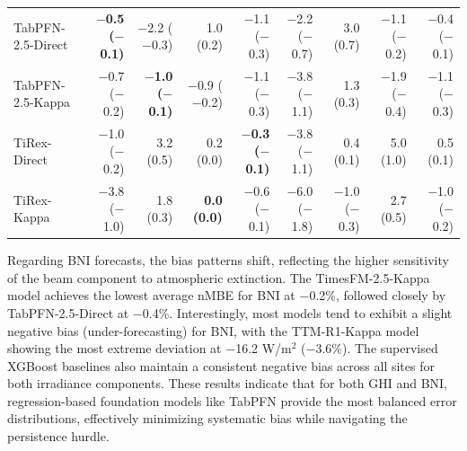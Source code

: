 \documentclass[number, 3p, 10pt, times]{elsarticle}
\begin{document}
\begin{table}[!ht]
\begin{tabular}{lrrrrrrrr}
TabPFN-2.5-Direct & \textbf{$-$0.5 ($-$0.1)} & $-$2.2 ($-$0.3) & 1.0 (0.2) & $-$1.1 ($-$0.3) & $-$2.2 ($-$0.7) & 3.0 (0.7) & $-$1.1 ($-$0.2) & $-$0.4 ($-$0.1) \\
TabPFN-2.5-Kappa & $-$0.7 ($-$0.2) & \textbf{$-$1.0 ($-$0.1)} & $-$0.9 ($-$0.2) & $-$1.1 ($-$0.3) & $-$3.8 ($-$1.1) & 1.3 (0.3) & $-$1.9 ($-$0.4) & $-$1.1 ($-$0.3) \\
TiRex-Direct & $-$1.0 ($-$0.2) & 3.2 (0.5) & 0.2 (0.0) & \textbf{$-$0.3 ($-$0.1)} & $-$3.8 ($-$1.1) & 0.4 (0.1) & 5.0 (1.0) & 0.5 (0.1) \\
TiRex-Kappa & $-$3.8 ($-$1.0) & 1.8 (0.3) & \textbf{0.0 (0.0)} & $-$0.6 ($-$0.1) & $-$6.0 ($-$1.8) & $-$1.0 ($-$0.3) & 2.7 (0.5) & $-$1.0 ($-$0.2) \\
\bottomrule
\end{tabular}
\end{table}

Regarding BNI forecasts, the bias patterns shift, reflecting the higher sensitivity of the beam component to atmospheric extinction. The TimesFM-2.5-Kappa model achieves the lowest average nMBE for BNI at $-$0.2\%, followed closely by TabPFN-2.5-Direct at $-$0.4\%. Interestingly, most models tend to exhibit a slight negative bias (under-forecasting) for BNI, with the TTM-R1-Kappa model showing the most extreme deviation at $-$16.2 W/m$^2$ ($-$3.6\%). The supervised XGBoost baselines also maintain a consistent negative bias across all sites for both irradiance components. These results indicate that for both GHI and BNI, regression-based foundation models like TabPFN provide the most balanced error distributions, effectively minimizing systematic bias while navigating the persistence hurdle.
\end{document}
